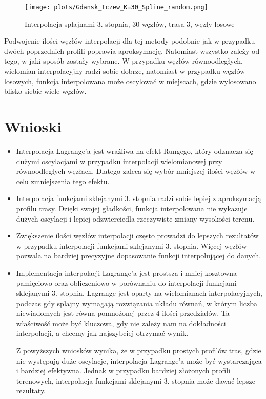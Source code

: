 \documentclass{article}
\begin{document}
\begin{figure}[H]
    \centering
    \texttt{[image: plots/Gdansk\_Tczew\_K=30\_Spline\_random.png]}
    \caption{Interpolacja splajnami 3. stopnia, 30 węzłów, trasa 3, węzły losowe}
\end{figure}

Podwojenie ilości węzłów interpolacji dla tej metody podobnie jak w przypadku 
dwóch poprzednich profili poprawia aproksymację. Natomiast wszystko zależy od tego, w jaki
sposób zostały wybrane. W przypadku węzłów równoodległych, wielomian interpolacyjny
radzi sobie dobrze, natomiast w przypadku węzłów losowych, funkcja interpolowana
może oscylować w miejscach, gdzie wylosowano blisko siebie wiele węzłów.

\newpage

\section{Wnioski}

\begin{itemize}
    \item Interpolacja Lagrange'a jest wrażliwa na efekt Rungego, 
    który odznacza się dużymi oscylacjami w przypadku interpolacji 
    wielomianowej przy równoodległych węzłach. Dlatego zaleca się wybór 
    mniejszej ilości węzłów w celu zmniejszenia tego efektu.

    \item Interpolacja funkcjami sklejanymi 3. stopnia radzi sobie 
    lepiej z aproksymacją profilu trasy. Dzięki swojej gładkości, funkcja 
    interpolowana nie wykazuje dużych oscylacji i lepiej odzwierciedla 
    rzeczywiste zmiany wysokości terenu.

    \item Zwiększenie ilości węzłów interpolacji często prowadzi do lepszych rezultatów 
    w przypadku interpolacji funkcjami sklejanymi 3. stopnia. Więcej węzłów 
    pozwala na bardziej precyzyjne dopasowanie funkcji interpolującej do danych.

    \item Implementacja interpolacji Lagrange'a jest prostsza i mniej 
    kosztowna pamięciowo oraz obliczeniowo w porównaniu do interpolacji 
    funkcjami sklejanymi 3. stopnia. Lagrange jest oparty na wielomianach 
    interpolacyjnych, podczas gdy splajny wymagają rozwiązania układu równań,
    w którym liczba niewiadomych jest równa pomnożonej przez 4 ilości przedziałów.
    Ta właściwość może być kluczowa, gdy nie zależy nam na dokładności interpolacji,
    a chcemy jak najszybciej otrzymać wynik.

    Z powyższych wniosków wynika, że w przypadku prostych profilów tras, 
    gdzie nie występują duże oscylacje, interpolacja Lagrange'a 
    może być wystarczająca i bardziej efektywna. Jednak w przypadku 
    bardziej złożonych profili terenowych, interpolacja funkcjami 
    sklejanymi 3. stopnia może dawać lepsze rezultaty.
\end{itemize}
\end{document}
